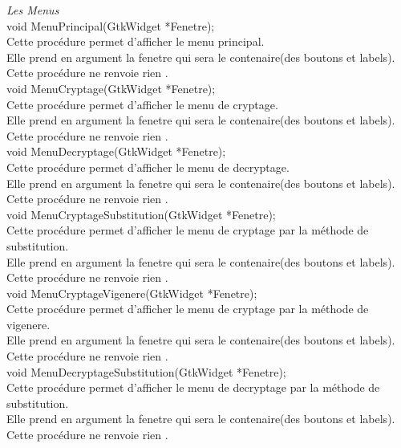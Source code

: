 \documentclass[a4]{article}
\begin{document}
		\textit{Les Menus}\\
		
	void MenuPrincipal(GtkWidget *Fenetre);\\
		Cette procédure permet d'afficher le menu principal.\\
		Elle prend en argument la fenetre qui sera le contenaire(des boutons et labels).\\
		Cette procédure ne renvoie rien .\\
	
	void MenuCryptage(GtkWidget *Fenetre);\\
		Cette procédure permet d'afficher le menu de cryptage.\\
		Elle prend en argument la fenetre qui sera le contenaire(des boutons et labels).\\
		Cette procédure ne renvoie rien .\\
	
	void MenuDecryptage(GtkWidget *Fenetre);\\
		Cette procédure permet d'afficher le menu de decryptage.\\
		Elle prend en argument la fenetre qui sera le contenaire(des boutons et labels).\\
		Cette procédure ne renvoie rien .\\
	
	void MenuCryptageSubstitution(GtkWidget *Fenetre);\\
		Cette procédure permet d'afficher le menu de cryptage par la méthode de substitution.\\
		Elle prend en argument la fenetre qui sera le contenaire(des boutons et labels).\\
		Cette procédure ne renvoie rien .\\
	
	void MenuCryptageVigenere(GtkWidget *Fenetre);\\
		Cette procédure permet d'afficher le menu de cryptage par la méthode de vigenere.\\
		Elle prend en argument la fenetre qui sera le contenaire(des boutons et labels).\\
		Cette procédure ne renvoie rien .\\
	
	void MenuDecryptageSubstitution(GtkWidget *Fenetre);\\
		Cette procédure permet d'afficher le menu de decryptage par la méthode de substitution.\\
		Elle prend en argument la fenetre qui sera le contenaire(des boutons et labels).\\
		Cette procédure ne renvoie rien .\\
	
\end{document}
